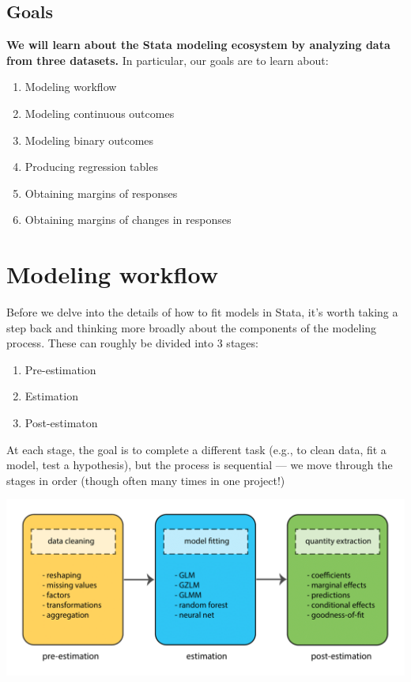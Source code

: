 \documentclass[
]{book}
\providecommand{\tightlist}{%
  \setlength{\itemsep}{0pt}\setlength{\parskip}{0pt}}
\begin{document}
\hypertarget{goals-7}{%
\subsection{Goals}\label{goals-7}}

\textbf{We will learn about the Stata modeling ecosystem by analyzing data from three datasets.} In particular, our goals are to learn about:

\begin{enumerate}
\def\labelenumi{\arabic{enumi}.}
\tightlist
\item
  Modeling workflow
\item
  Modeling continuous outcomes\\
\item
  Modeling binary outcomes
\item
  Producing regression tables
\item
  Obtaining margins of responses
\item
  Obtaining margins of changes in responses
\end{enumerate}

\hypertarget{modeling-workflow-1}{%
\section{Modeling workflow}\label{modeling-workflow-1}}

Before we delve into the details of how to fit models in Stata, it's worth taking a step back and thinking more broadly about the components of the modeling process. These can roughly be divided into 3 stages:

\begin{enumerate}
\def\labelenumi{\arabic{enumi}.}
\tightlist
\item
  Pre-estimation
\item
  Estimation
\item
  Post-estimaton
\end{enumerate}

At each stage, the goal is to complete a different task (e.g., to clean data, fit a model, test a hypothesis),
but the process is sequential --- we move through the stages in order (though often many times in one project!)

\includegraphics{Stata/StataModels/images/Stata_model_pipeline.png}
\end{document}
